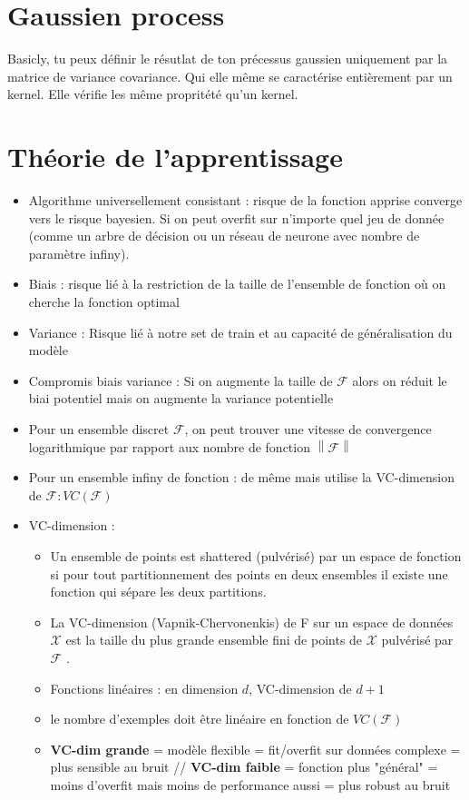 \documentclass{article}
\begin{document}
\section{Gaussien process}
Basicly, tu peux définir le résutlat de ton précessus gaussien uniquement par la matrice de variance covariance. Qui elle même se caractérise entièrement par un kernel. Elle vérifie les même propritété qu'un kernel.


\section{Théorie de l'apprentissage}

\begin{itemize}
    \item Algorithme universellement consistant : risque de la fonction apprise converge vers le risque bayesien. Si on peut overfit sur n'importe quel jeu de donnée (comme un arbre de décision ou un réseau de neurone avec nombre de paramètre infiny).
    \item Biais : risque lié à la restriction de la taille de l'ensemble de fonction où on cherche la fonction optimal
    \item Variance : Risque lié à notre set de train et au capacité de généralisation du modèle
    \item Compromis biais variance : Si on augmente la taille de $\mathcal{F}$ alors on réduit le biai potentiel mais on augmente la variance potentielle
    \item Pour un ensemble discret $ \mathcal{F} $, on peut trouver une vitesse de convergence logarithmique par rapport aux nombre de fonction $ \left\| \mathcal{F} \right\|  $ 
    \item Pour un ensemble infiny de fonction : de même mais utilise la VC-dimension de $ \mathcal{F} : VC(\mathcal{F}) $ 
    \item VC-dimension : \begin{itemize}
        \item Un ensemble de points est shattered (pulvérisé) par un espace de fonction si pour tout partitionnement des points en deux ensembles il existe une fonction qui sépare les deux partitions.
        \item La VC-dimension (Vapnik-Chervonenkis) de F sur un espace de données $ \mathcal{X} $  est la taille du plus grande ensemble fini de points de $ \mathcal{X} $  pulvérisé par $ \mathcal{F} $ .
        \item Fonctions linéaires : en dimension $ d $, VC-dimension de $ d + 1 $
        \item le nombre d'exemples doit être linéaire en fonction de $ VC(\mathcal{F}) $ 
        \item \textbf{VC-dim grande} = modèle flexible = fit/overfit sur données complexe = plus sensible au bruit // \textbf{VC-dim faible} = fonction plus "général" = moins d'overfit mais moins de performance aussi = plus robust au bruit 
    \end{itemize}
\end{itemize}
\end{document}
